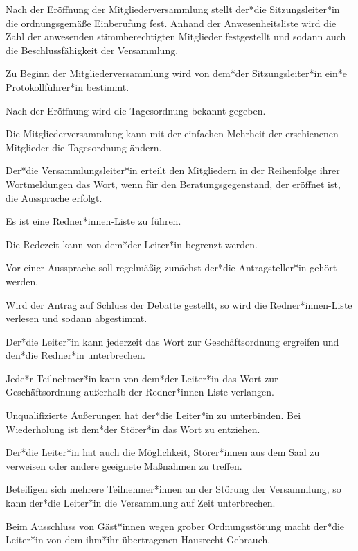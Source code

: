 \begin{gfmitglieder}
  Nach der Eröffnung der Mitgliederversammlung stellt der*die Sitzungsleiter*in die ordnungsgemäße Einberufung fest. Anhand der Anwesenheitsliste wird die Zahl der anwesenden stimmberechtigten Mitglieder festgestellt und sodann auch die Beschlussfähigkeit der Versammlung.

  Zu Beginn der Mitgliederversammlung wird von dem*der Sitzungsleiter*in ein*e Protokollführer*in bestimmt.


  Nach der Eröffnung wird die Tagesordnung bekannt gegeben.

  Die Mitgliederversammlung kann mit der einfachen Mehrheit der erschienenen Mitglieder die Tagesordnung ändern.


  Der*die Versammlungsleiter*in erteilt den Mitgliedern in der Reihenfolge ihrer Wortmeldungen das Wort, wenn für den Beratungsgegenstand, der eröffnet ist, die Aussprache erfolgt.

  Es ist eine Redner*innen-Liste zu führen.

  Die Redezeit kann von dem*der Leiter*in begrenzt werden.

  Vor einer Aussprache soll regelmäßig zunächst der*die Antragsteller*in gehört werden.

  Wird der Antrag auf Schluss der Debatte gestellt, so wird die Redner*innen-Liste verlesen und sodann abgestimmt.


  Der*die Leiter*in kann jederzeit das Wort zur Geschäftsordnung ergreifen und den*die Redner*in unterbrechen.

  Jede*r Teilnehmer*in kann von dem*der Leiter*in das Wort zur Geschäftsordnung außerhalb der Redner*innen-Liste verlangen.


  Unqualifizierte Äußerungen hat der*die Leiter*in zu unterbinden. Bei Wiederholung ist dem*der Störer*in das Wort zu entziehen.

  Der*die Leiter*in hat auch die Möglichkeit, Störer*innen aus dem Saal zu verweisen oder andere geeignete Maßnahmen zu treffen.

  Beteiligen sich mehrere Teilnehmer*innen an der Störung der Versammlung, so kann der*die Leiter*in die Versammlung auf Zeit unterbrechen.

  Beim Ausschluss von Gäst*innen wegen grober Ordnungsstörung macht der*die Leiter*in von dem ihm*ihr übertragenen Hausrecht Gebrauch.


\end{gfmitglieder}
